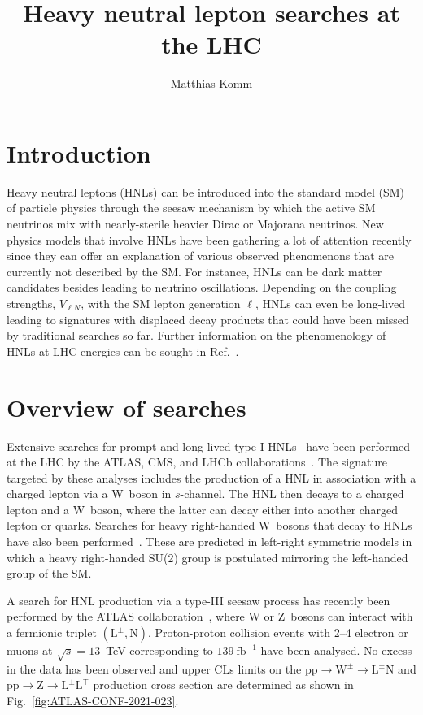 \documentclass[a4paper,11pt]{article}
\title{Heavy neutral lepton searches at the LHC}
\author*[a,1]{Matthias Komm}
\affiliation[a]{CERN,\\
  Geneva, Switzerland}
\begin{document}
\maketitle


\section{Introduction}
Heavy neutral leptons (HNLs) can be introduced into the standard model (SM) of particle physics through the seesaw mechanism by which the active SM neutrinos mix with nearly-sterile heavier Dirac or Majorana neutrinos. New physics models that involve HNLs have been gathering a lot of attention recently since they can offer an explanation of various observed phenomenons that are currently not described by the SM. For instance, HNLs can be dark matter candidates besides leading to neutrino oscillations. Depending on the coupling strengths, $V_{\ell N}$, with the SM lepton generation $\ell$, HNLs can even be long-lived leading to signatures with displaced decay products that could have been missed by traditional searches so far. Further information on the phenomenology of HNLs at LHC energies can be sought in Ref.~\cite{pheno}.

\section{Overview of searches}
Extensive searches for prompt and long-lived type-I HNLs~\cite{llp1,llp2,llp3} have been performed at the LHC by the ATLAS, CMS, and LHCb collaborations~\cite{atlas,cms,lhcb}. The signature targeted by these analyses includes the production of a HNL in association with a charged lepton via a W~boson in $s$-channel. The HNL then decays to a charged lepton and a W~boson, where the latter can decay either into another charged lepton or quarks. Searches for heavy right-handed W~bosons that decay to HNLs have also been performed~\cite{wr1,wr2,wr3,wr4}. These are predicted in left-right symmetric models in which a heavy right-handed SU(2) group is postulated mirroring the left-handed group of the SM.

A search for HNL production via a type-III seesaw process has recently been performed by the ATLAS collaboration~\cite{ATLAS-CONF-2021-023}, where $\textrm{W}$ or $\textrm{Z}$~bosons can interact with a fermionic triplet $(\textrm{L}^{\pm},\textrm{N})$. Proton-proton collision events with 2--4 electron or muons at $\sqrt{s}=13$~TeV corresponding to $139~\mathrm{fb}^{-1}$ have been analysed. No excess in the data has been observed and upper CLs limits on the $\textrm{pp}\to\textrm{W}^{\pm}\to\textrm{L}^{\pm}\textrm{N}$ and $\textrm{pp}\to\textrm{Z}\to\textrm{L}^{\pm}\textrm{L}^{\mp}$ production cross section are determined as shown in Fig.~\ref{fig:ATLAS-CONF-2021-023}.
\end{document}
